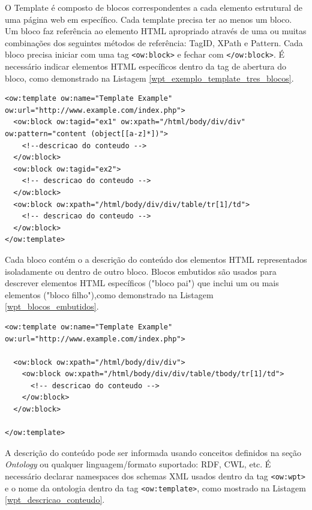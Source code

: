O Template é composto de blocos correspondentes a cada elemento estrutural de uma página web em específico. Cada template precisa ter ao menos um bloco. Um bloco faz referência ao elemento HTML apropriado através de uma ou muitas combinações dos seguintes métodos de referência: TagID, XPath e Pattern. Cada bloco precisa iniciar com uma tag \texttt{<ow:block>} e fechar com \texttt{</ow:block>}. É necessário indicar elementos HTML específicos dentro da tag de abertura do bloco, como demonstrado na Listagem \ref{wpt_exemplo_template_tres_blocos}.

\pagebreak
{}
\begin{lstlisting}[label=wpt_exemplo_template_tres_blocos]
<ow:template ow:name="Template Example" ow:url="http://www.example.com/index.php">
  <ow:block ow:tagid="ex1" ow:xpath="/html/body/div/div" ow:pattern="content (object[[a-z]*])">
    <!--descricao do conteudo -->
  </ow:block>
  <ow:block ow:tagid="ex2">
    <!-- descricao do conteudo -->
  </ow:block>
  <ow:block ow:xpath="/html/body/div/div/table/tr[1]/td">
    <!-- descricao do conteudo -->
  </ow:block>
</ow:template>
\end{lstlisting}

Cada bloco contém o a descrição do conteúdo dos elementos HTML representados isoladamente ou dentro de outro bloco. Blocos embutidos são usados para descrever elementos HTML específicos ("bloco pai") que inclui um ou mais elementos ("bloco filho"),como demonstrado na Listagem \ref{wpt_blocos_embutidos}.

\begin{lstlisting}[label=wpt_blocos_embutidos]
<ow:template ow:name="Template Example" ow:url="http://www.example.com/index.php">

  <ow:block ow:xpath="/html/body/div/div">
    <ow:block ow:xpath="/html/body/div/div/table/tbody/tr[1]/td">
      <!-- descricao do conteudo -->
    </ow:block>
  </ow:block>
  
</ow:template>
\end{lstlisting}

A descrição do conteúdo pode ser informada usando conceitos definidos na seção \emph{Ontology} ou qualquer linguagem/formato suportado: RDF, CWL, etc. É necessário declarar namespaces dos schemas XML usados dentro da tag \texttt{<ow:wpt>} e o nome da ontologia dentro da tag \texttt{<ow:template>}, como mostrado na Listagem \ref{wpt_descricao_conteudo}.

